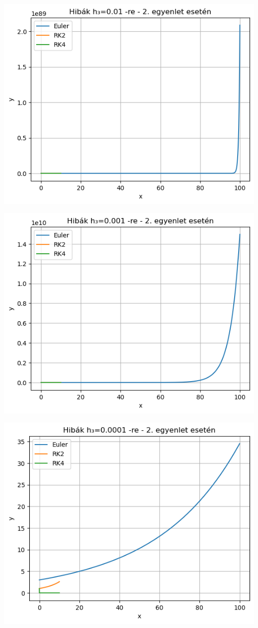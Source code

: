 \documentclass{article}
\begin{document}
\includegraphics[scale=1]{../plot_16.png} 

\includegraphics[scale=1]{../plot_17.png} 

\includegraphics[scale=1]{../plot_18.png} 

 
\end{document}
